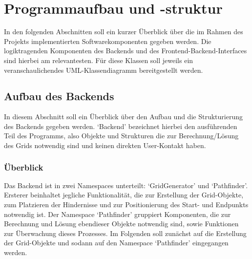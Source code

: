 \chapter{Programmaufbau und -struktur}
\label{ch:aufbau}
In den folgenden Abschnitten soll ein kurzer Überblick über die im Rahmen des Projekts implementierten Softwarekomponenten gegeben werden.
Die logiktragenden Komponenten des Backends und des Frontend-Backend-Interfaces sind hierbei am relevantesten.
Für diese Klassen soll jeweils ein veranschaulichendes \ac{UML}-Klassendiagramm bereitgestellt werden.
\section{Aufbau des Backends}
\label{sec:aufbau_backend}
In diesem Abschnitt soll ein Überblick über den Aufbau und die Strukturierung des Backends gegeben werden.
`Backend' bezeichnet hierbei den ausführenden Teil des Programms, also Objekte und Strukturen die zur Berechnung/Lösung des Grids notwendig sind und keinen direkten User-Kontakt haben.

\subsection{Überblick}
\label{subsec:aufbau_backend_ueberblick}
Das Backend ist in zwei Namespaces unterteilt: `GridGenerator' und `Pathfinder'.
Ersterer beinhaltet jegliche Funktionalität, die zur Erstellung der Grid-Objekte, zum Platzieren der Hindernisse und zur Positionierung des Start- und Endpunkts notwendig ist.
Der Namespace `Pathfinder' gruppiert Komponenten, die zur Berechnung und Lösung ebendieser Objekte notwendig sind, sowie Funktionen zur Überwachung dieses Prozesses.
Im Folgenden soll zunächst auf die Erstellung der Grid-Objekte und sodann auf den Namespace `Pathfinder' eingegangen werden.

